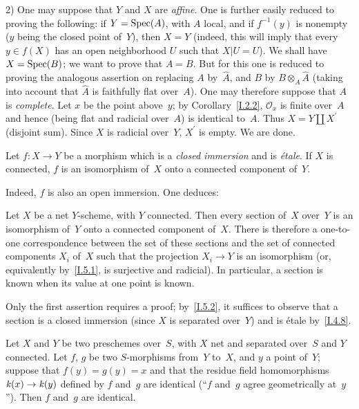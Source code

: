 2) One may suppose that $Y$ and $X$ are \emph{affine}. One is
further easily reduced to proving the following: if $Y=\operatorname{Spec}(A)$,
with $A$ local, and if $f^{-1}(y)$ is nonempty ($y$ being the
closed point of~$Y$), then $X=Y$ (indeed, this will imply that
every $y\in f(X)$ has an open neighborhood $U$ such that $X|U=U$).
We shall have $X=\operatorname{Spec}(B)$; we want to prove that $A=B$. But for
this one is reduced to proving the analogous assertion on
replacing $A$ by~$\hat A$, and $B$ by $B\otimes_A\hat A$
(taking into account that $\hat A$ is faithfully flat over~$A$).
One may therefore suppose that $A$ is \emph{complete}. Let $x$
be the point above~$y$; by Corollary~\ref{I.2.2}, $\mathcal{O}_x$
is finite over~$A$ and hence (being flat and radicial over~$A$)
is identical to~$A$. Thus $X=Y\amalg X^\prime$ (disjoint sum).
Since $X$ is radicial over~$Y$, $X^\prime$ is empty. We are done.

\begin{corollary}
\label{I.5.2}
Let $f\colon X\to Y$ be a morphism which is a \emph{closed
immersion} and is \emph{\'etale}. If $X$ is connected, $f$ is
an isomorphism of~$X$ onto a connected component of~$Y$.
\end{corollary}

Indeed, $f$ is also an open immersion. One deduces:

\begin{corollary}
\label{I.5.3}
Let
$X$ be a net $Y$-scheme, with $Y$ connected. Then every section
of~$X$ over~$Y$ is an isomorphism of~$Y$ onto a connected
component of~$X$. There is therefore a one-to-one correspondence
between the set of these sections and the set of connected
components $X_i$ of~$X$ such that the projection $X_i\to Y$
is an isomorphism (or, equivalently by~\ref{I.5.1}, is surjective
and radicial). In particular, a section is known when its value
at one point is known.
\end{corollary}

Only the first assertion requires a proof; by~\ref{I.5.2}, it
suffices to observe that a section is a closed immersion
(since $X$ is separated over~$Y$) and is \'etale by~\ref{I.4.8}.

\begin{corollary}
\label{I.5.4}
Let $X$ and $Y$ be two preschemes over~$S$, with $X$ net and
separated over~$S$ and $Y$ connected. Let $f$, $g$ be two
$S$-morphisms from~$Y$ to~$X$, and $y$ a point of~$Y$; suppose
that $f(y)=g(y)=x$ and that the residue field homomorphisms
$\kres(x)\to\kres(y)$ defined by $f$ and~$g$ are identical
(``$f$ and~$g$ agree geometrically at~$y$''). Then $f$ and~$g$
are identical.
\end{corollary}

